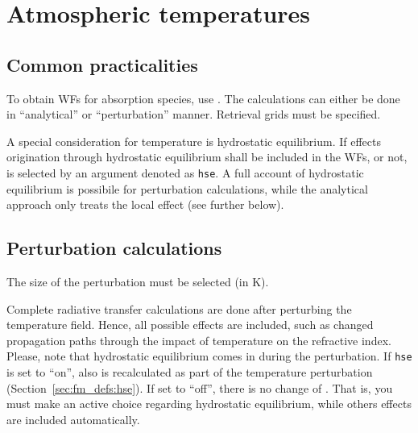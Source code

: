 \section{Atmospheric temperatures}
\label{sec:wfuns:atmtemp}

\subsection{Common practicalities}
%
To obtain WFs for absorption species, use .
The calculations can either be done in ``analytical'' or ``perturbation''
manner. Retrieval grids must be specified.

A special consideration for temperature is hydrostatic equilibrium. If effects
origination through hydrostatic equilibrium shall be included in the WFs, or
not, is selected by an argument denoted as \verb|hse|. A full account of
hydrostatic equilibrium is possibile for perturbation calculations, while the
analytical approach only treats the local effect (see further below).


\subsection{Perturbation calculations}
%
The size of the perturbation must be selected (in K).

Complete radiative transfer calculations are done after perturbing the
temperature field. Hence, all possible effects are included, such as changed
propagation paths through the impact of temperature on the refractive index.
Please, note that hydrostatic equilibrium comes in during the perturbation. If
\verb|hse| is set to ``on'', also  is recalculated as part
of the temperature perturbation (Section~\ref{sec:fm_defs:hse}). If set to
``off'', there is no change of . That is, you must make an
active choice regarding hydrostatic equilibrium, while others effects are
included automatically.


